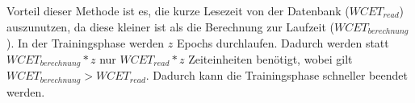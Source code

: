 Vorteil dieser Methode ist es, die kurze Lesezeit von der Datenbank ($WCET_{read}$) auszunutzen, da diese kleiner ist als die Berechnung zur Laufzeit ($WCET_{berechnung}$). In der Trainingsphase werden $z$ Epochs durchlaufen. Dadurch werden statt  $WCET_{berechnung} * z$ nur $WCET_{read} * z$ Zeiteinheiten benötigt, wobei gilt $WCET_{berechnung} > WCET_{read}$. Dadurch kann die Trainingsphase schneller beendet werden.
































